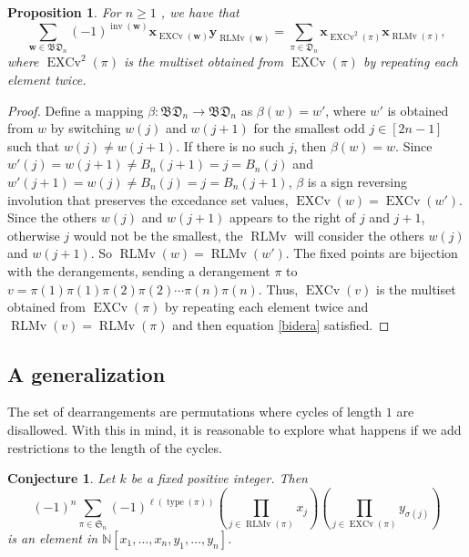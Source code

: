 \documentclass[reqno]{amsart}
\newtheorem{proposition}[theorem]{Proposition}
\newtheorem{conjecture}[theorem]{Conjecture}
\theoremstyle{definition}
\newcommand{\setN}{\mathbb{N}}
\newcommand{\xvec}{\mathbf{x}}
\newcommand{\yvec}{\mathbf{y}}
\newcommand{\wvec}{\mathbf{w}}
\newcommand{\symS}{\mathfrak{S}}
\newcommand{\dArr}{\mathfrak{D}}
\newcommand{\bdArr}{\mathfrak{BD}}
\DeclareMathOperator{\inv}{inv}
\DeclareMathOperator{\type}{type}
\DeclareMathOperator{\length}{\ell}
\DeclareMathOperator{\EXCv}{EXCv}
\DeclareMathOperator{\RLMv}{RLMv}
\begin{document}
\begin{proposition}
For $n\geq 1$ , we have that 
\begin{equation}\label{bidera}
 \sum_{\wvec \in \bdArr_n} (-1)^{\inv(\wvec)} 
 \xvec_{\EXCv(\wvec)} \yvec_{\RLMv(\wvec)}
 = 
 \sum_{\pi \in \dArr_n} \xvec_{\EXCv^2(\pi)} \xvec_{\RLMv(\pi)},
\end{equation}
where $\EXCv^2(\pi)$ is the multiset obtained from $\EXCv(\pi)$ by repeating each element twice.
\end{proposition}
\begin{proof}
Define a mapping $\beta:\bdArr_n\to\bdArr_n$ as $\beta(w)=w'$, where $w'$ is obtained
from $w$ by switching $w(j)$ and $w(j+1)$ for the smallest odd $j\in[2n-1]$ such that $w(j)\neq w(j+1)$.
If there is no such $j$, then $\beta(w)=w$.
Since $w'(j)=w(j+1)\neq B_n(j+1)=j=B_n(j)$ and $w'(j+1)=w(j)\neq B_n(j)=j=B_n(j+1)$, 
$\beta$ is a sign reversing involution that preserves
the excedance set values, $\EXCv(w)=\EXCv(w')$.
Since the others $w(j)$ and $w(j+1)$ appears to
the right of $j$ and $j+1$, otherwise $j$ would
not be the smallest, the $\RLMv$ will consider
the others $w(j)$ and $w(j+1)$. So $\RLMv(w)=\RLMv(w')$.  
The fixed points are bijection with the derangements,
sending a derangement 
$\pi$ to $v=\pi(1)\pi(1)\pi(2)\pi(2) \dotsb \pi(n)\pi(n)$.
Thus, $\EXCv(v)$ is the multiset obtained from 
$\EXCv(\pi)$ by repeating each element twice 
and $\RLMv(v)=\RLMv(\pi)$ and then equation 
\ref{bidera} satisfied.
\end{proof}



\subsection{A generalization}

The set of dearrangements are permutations where cycles of length $1$
are disallowed. With this in mind, it is reasonable to explore what 
happens if we add restrictions to the length of the cycles.

\begin{conjecture}
Let $k$ be a fixed positive integer.
Then
\[
(-1)^n
 \sum_{\pi \in \symS_n} (-1)^{\length(\type(\pi))}
 \left(\prod_{j\in \RLMv(\pi)} x_j \right)
 \left(\prod_{j\in \EXCv(\pi)} y_{\sigma(j)} \right)
\]
is an element in $\setN[x_1,\dotsc,x_n,y_1,\dotsc,y_n]$.
\end{conjecture}
\end{document}
